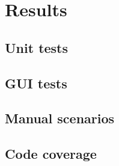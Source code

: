 \section{Results}
\subsection{Unit tests}
\subsection{GUI tests}
\subsection{Manual scenarios}
\subsection{Code coverage}
